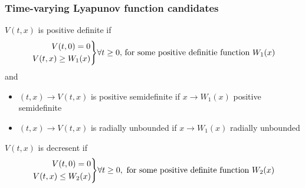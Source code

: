 \documentclass{article}
\newenvironment{rcases}
{\left.\begin{aligned}}
		{\end{aligned}\right\rbrace}
\begin{document}
\subsubsection{Time-varying Lyapunov function candidates}
$V(t,x)$ is positive definite if
\begin{equation*}
	\begin{rcases}
		V(t,0) = 0 \\
		V(t,x) \geq W_1(x)
	\end{rcases}
	\forall t \geq 0 \text{, for some positive definitie function } W_1(x)
\end{equation*}
and
\begin{itemize}
	\item $(t,x) \rightarrow V(t,x)$ is positive semidefinite if $x \rightarrow	W_1(x)$ positive semidefinite
	\item $(t,x) \rightarrow V(t,x)$ is radially unbounded if $x \rightarrow	W_1(x)$ radially unbounded
\end{itemize}
$V(t,x)$ is decresent if
\begin{equation*}
	\begin{rcases}
		V(t,0) = 0 \\
		V(t,x) \leq W_2(x)
	\end{rcases}
	\forall t \geq 0, \text{ for some positive definite function } W_2(x)
\end{equation*}
\begin{figure}[h]
	\centering
	
\end{figure}
\end{document}
